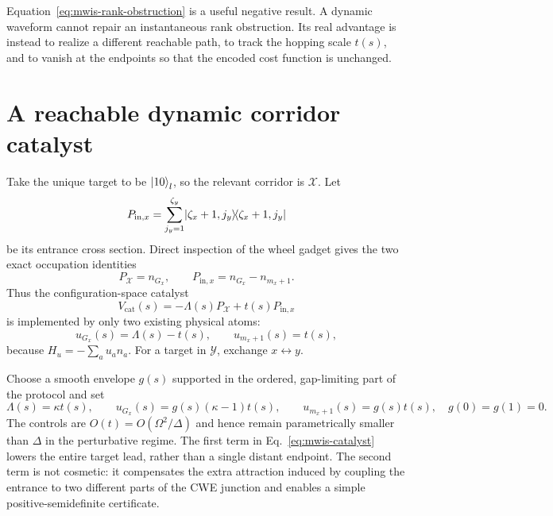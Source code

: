 Equation~\eqref{eq:mwis-rank-obstruction} is a useful negative result.  A
dynamic waveform cannot repair an instantaneous rank obstruction.  Its real
advantage is instead to realize a different reachable path, to track the
hopping scale $t(s)$, and to vanish at the endpoints so that the encoded cost
function is unchanged.

\section{A reachable dynamic corridor catalyst}
\label{sec:mwis-corridor-catalyst}

Take the unique target to be $\ket{10}_l$, so the relevant corridor is
$\mathcal X$.  Let
\begin{equation}
 P_{\mathrm{in},x}
 =\sum_{j_y=1}^{\zeta_y}
 \lvert \zeta_x+1,j_y\rangle\!\langle \zeta_x+1,j_y\rvert
 \label{eq:mwis-entrance-projector}
\end{equation}
be its entrance cross section.  Direct inspection of the wheel gadget gives
the two exact occupation identities
\begin{equation}
 P_{\mathcal X}=n_{G_x},\qquad
 P_{\mathrm{in},x}=n_{G_x}-n_{m_x+1}.
 \label{eq:mwis-corridor-identities}
\end{equation}
Thus the configuration-space catalyst
\begin{equation}
 V_{\mathrm{cat}}(s)
 =-\Lambda(s)P_{\mathcal X}+t(s)P_{\mathrm{in},x}
 \label{eq:mwis-catalyst}
\end{equation}
is implemented by only two existing physical atoms:
\begin{equation}
 u_{G_x}(s)=\Lambda(s)-t(s),\qquad
 u_{m_x+1}(s)=t(s),
 \label{eq:mwis-two-atom-controls}
\end{equation}
because $H_u=-\sum_a u_an_a$.  For a target in $\mathcal Y$, exchange
$x\leftrightarrow y$.

Choose a smooth envelope $g(s)$ supported in the ordered, gap-limiting part of
the protocol and set
\begin{equation}
 \Lambda(s)=\kappa t(s),\qquad
 u_{G_x}(s)=g(s)(\kappa-1)t(s),\qquad
 u_{m_x+1}(s)=g(s)t(s),
 \quad g(0)=g(1)=0.
 \label{eq:mwis-dynamic-waveform}
\end{equation}
The controls are $O(t)=O(\Omega^2/\Delta)$ and hence remain parametrically
smaller than $\Delta$ in the perturbative regime.  The first term in
Eq.~\eqref{eq:mwis-catalyst} lowers the entire target lead, rather than a
single distant endpoint.  The second term is not cosmetic: it compensates the
extra attraction induced by coupling the entrance to two different parts of
the CWE junction and enables a simple positive-semidefinite certificate.

